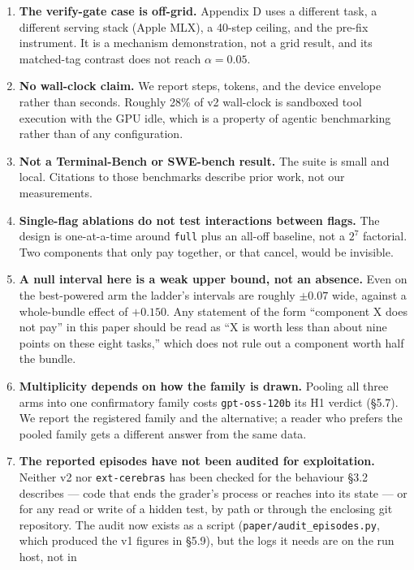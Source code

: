 \documentclass[
  10pt,
  a4paper,
]{article}
\let\oldtexttt\texttt
\renewcommand{\texttt}[1]{{\small\oldtexttt{#1}}}
\begin{document}
\begin{enumerate}
  \texttt{ast\_transformer} is at the floor for Ornith in three of nine
  cells and contributes almost nothing to that arm.
\item
  \textbf{The verify-gate case is off-grid.} Appendix D uses a different
  task, a different serving stack (Apple MLX), a 40-step ceiling, and
  the pre-fix instrument. It is a mechanism demonstration, not a grid
  result, and its matched-tag contrast does not reach \(\alpha = 0.05\).
\item
  \textbf{No wall-clock claim.} We report steps, tokens, and the device
  envelope rather than seconds. Roughly 28\% of v2 wall-clock is
  sandboxed tool execution with the GPU idle, which is a property of
  agentic benchmarking rather than of any configuration.
\item
  \textbf{Not a Terminal-Bench or SWE-bench result.} The suite is small
  and local. Citations to those benchmarks describe prior work, not our
  measurements.
\item
  \textbf{Single-flag ablations do not test interactions between flags.}
  The design is one-at-a-time around \texttt{full} plus an all-off
  baseline, not a \(2^7\) factorial. Two components that only pay
  together, or that cancel, would be invisible.
\item
  \textbf{A null interval here is a weak upper bound, not an absence.}
  Even on the best-powered arm the ladder's intervals are roughly
  \(\pm 0.07\) wide, against a whole-bundle effect of \(+0.150\). Any
  statement of the form ``component X does not pay'' in this paper
  should be read as ``X is worth less than about nine points on these
  eight tasks,'' which does not rule out a component worth half the
  bundle.
\item
  \textbf{Multiplicity depends on how the family is drawn.} Pooling all
  three arms into one confirmatory family costs \texttt{gpt-oss-120b}
  its H1 verdict (§5.7). We report the registered family and the
  alternative; a reader who prefers the pooled family gets a different
  answer from the same data.
\item
  \textbf{The reported episodes have not been audited for exploitation.}
  Neither v2 nor \texttt{ext-cerebras} has been checked for the
  behaviour §3.2 describes --- code that ends the grader's process or
  reaches into its state --- or for any read or write of a hidden test,
  by path or through the enclosing git repository. The audit now exists
  as a script (\texttt{paper/audit\_episodes.py}, which produced the v1
  figures in §5.9), but the logs it needs are on the run host, not in

\end{enumerate}
\end{document}
